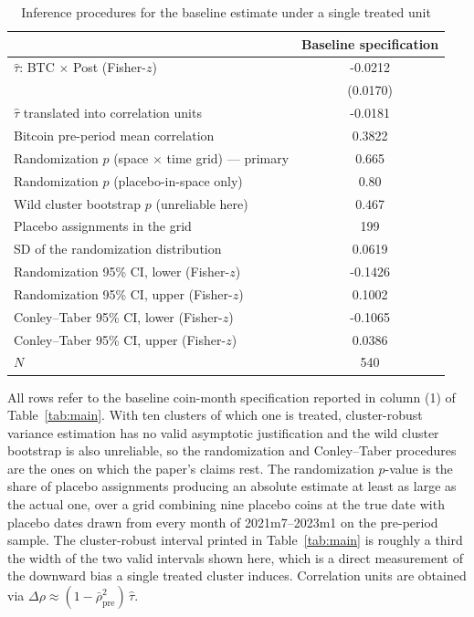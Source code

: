 \begin{table}[t]
\centering
\begin{threeparttable}
\caption{Inference procedures for the baseline estimate under a single treated unit}
\label{tab:inference}
\begin{tabular}{lc}
\toprule
 & Baseline specification \\
\midrule
$\hat\tau$: BTC $\times$ Post (Fisher-$z$) & -0.0212 \\
 & (0.0170) \\
$\hat\tau$ translated into correlation units & -0.0181 \\
Bitcoin pre-period mean correlation & 0.3822 \\
Randomization $p$ (space $\times$ time grid) --- primary & 0.665 \\
Randomization $p$ (placebo-in-space only) & 0.80 \\
Wild cluster bootstrap $p$ (unreliable here) & 0.467 \\
Placebo assignments in the grid & 199 \\
SD of the randomization distribution & 0.0619 \\
Randomization 95\% CI, lower (Fisher-$z$) & -0.1426 \\
Randomization 95\% CI, upper (Fisher-$z$) & 0.1002 \\
Conley--Taber 95\% CI, lower (Fisher-$z$) & -0.1065 \\
Conley--Taber 95\% CI, upper (Fisher-$z$) & 0.0386 \\
$N$ & 540 \\
\bottomrule
\end{tabular}
\begin{tablenotes}[flushleft]
\footnotesize
\item All rows refer to the baseline coin-month specification reported in column (1) of Table~\ref{tab:main}. With ten clusters of which one is treated, cluster-robust variance estimation has no valid asymptotic justification and the wild cluster bootstrap is also unreliable, so the randomization and Conley--Taber procedures are the ones on which the paper's claims rest. The randomization $p$-value is the share of placebo assignments producing an absolute estimate at least as large as the actual one, over a grid combining nine placebo coins at the true date with placebo dates drawn from every month of 2021m7--2023m1 on the pre-period sample. The cluster-robust interval printed in Table~\ref{tab:main} is roughly a third the width of the two valid intervals shown here, which is a direct measurement of the downward bias a single treated cluster induces. Correlation units are obtained via $\Delta\rho \approx (1-\bar\rho_{\mathrm{pre}}^2)\,\hat\tau$.
\end{tablenotes}
\end{threeparttable}
\end{table}
